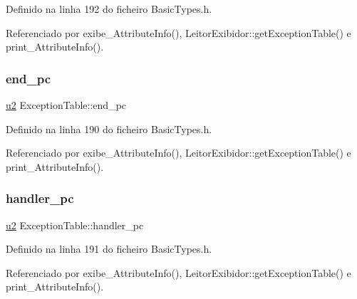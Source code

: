 Definido na linha 192 do ficheiro Basic\+Types.\+h.



Referenciado por exibe\+\_\+\+Attribute\+Info(), Leitor\+Exibidor\+::get\+Exception\+Table() e print\+\_\+\+Attribute\+Info().

\mbox{\label{structExceptionTable_ac2df73606ebe48af50a629f83fe9c677}} 
\subsubsection{\texorpdfstring{end\+\_\+pc}{end\_pc}}
{\footnotesize\ttfamily \hyperlink{BasicTypes_8h_a732cde1300aafb73b0ea6c2558a7a54f}{u2} Exception\+Table\+::end\+\_\+pc}



Definido na linha 190 do ficheiro Basic\+Types.\+h.



Referenciado por exibe\+\_\+\+Attribute\+Info(), Leitor\+Exibidor\+::get\+Exception\+Table() e print\+\_\+\+Attribute\+Info().

\mbox{\label{structExceptionTable_a664ec4b395e02d3a5bfa6cef3493c1e7}} 
\subsubsection{\texorpdfstring{handler\+\_\+pc}{handler\_pc}}
{\footnotesize\ttfamily \hyperlink{BasicTypes_8h_a732cde1300aafb73b0ea6c2558a7a54f}{u2} Exception\+Table\+::handler\+\_\+pc}



Definido na linha 191 do ficheiro Basic\+Types.\+h.



Referenciado por exibe\+\_\+\+Attribute\+Info(), Leitor\+Exibidor\+::get\+Exception\+Table() e print\+\_\+\+Attribute\+Info().

\mbox{\label{structExceptionTable_af137b3a966825f91146039797d3b1ba5}} 
